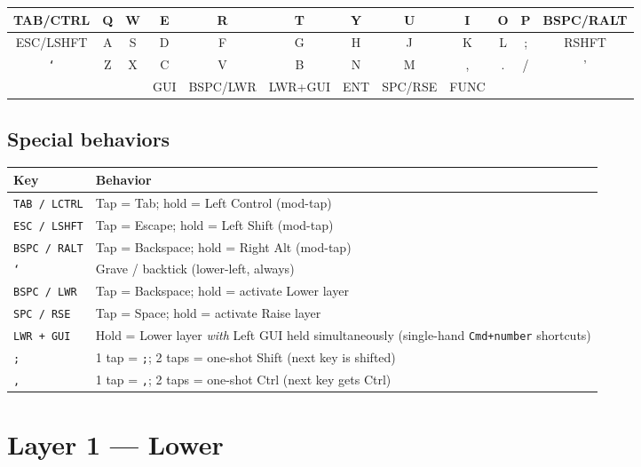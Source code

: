 \documentclass[11pt, letterpaper]{article}
\begin{document}
\begin{center}
\renewcommand{\arraystretch}{1.4}
\begin{tabular}{|c|c|c|c|c|c||c|c|c|c|c|c|}
\hline
TAB/CTRL & Q & W & E & R & T & Y & U & I & O & P & BSPC/RALT \\
\hline
ESC/LSHFT & A & S & D & F & G & H & J & K & L & ; & RSHFT \\
\hline
\texttt{`} & Z & X & C & V & B & N & M & , & . & / & ' \\
\hline
\multicolumn{3}{|c}{} &
GUI &
\multicolumn{1}{|c|}{BSPC/LWR} &
\multicolumn{1}{|c||}{LWR+GUI} &
\multicolumn{1}{c|}{ENT} &
\multicolumn{1}{c|}{SPC/RSE} &
\multicolumn{1}{c|}{FUNC} &
\multicolumn{3}{c}{} \\
\hline
\end{tabular}
\end{center}

\subsection*{Special behaviors}

\begin{tabular}{lp{9cm}}
\toprule
\textbf{Key} & \textbf{Behavior} \\
\midrule
\texttt{TAB / LCTRL}   & Tap = Tab; hold = Left Control (mod-tap) \\
\texttt{ESC / LSHFT}   & Tap = Escape; hold = Left Shift (mod-tap) \\
\texttt{BSPC / RALT}   & Tap = Backspace; hold = Right Alt (mod-tap) \\
\texttt{`}             & Grave / backtick (lower-left, always) \\
\texttt{BSPC / LWR}    & Tap = Backspace; hold = activate Lower layer \\
\texttt{SPC / RSE}     & Tap = Space; hold = activate Raise layer \\
\texttt{LWR + GUI}     & Hold = Lower layer \emph{with} Left GUI held simultaneously (single-hand \texttt{Cmd+number} shortcuts) \\
\texttt{;}             & 1 tap = \texttt{;}; 2 taps = one-shot Shift (next key is shifted) \\
\texttt{,}             & 1 tap = \texttt{,}; 2 taps = one-shot Ctrl (next key gets Ctrl) \\
\bottomrule
\end{tabular}

\section{Layer 1 — Lower}
\end{document}
